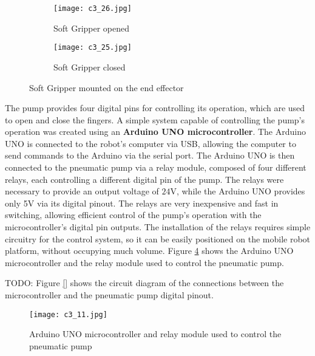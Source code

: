 \begin{figure}[t]
    \centering
    \begin{subfigure}{0.45\textwidth}
        \texttt{[image: c3\_26.jpg]}
        \caption{Soft Gripper opened}
        \label{fig:opened}
    \end{subfigure}
    \hfill %
    \begin{subfigure}{0.45\textwidth}
        \texttt{[image: c3\_25.jpg]}
        \caption{Soft Gripper closed}
        \label{fig:closed}
    \end{subfigure}
    \caption{Soft Gripper mounted on the end effector}
    \label{fig:sg_combined}
\end{figure}


The pump provides four digital pins for controlling its operation, which are used to open and close the fingers.
A simple system capable of controlling the pump's operation was created using an \textbf{Arduino UNO microcontroller}.
The Arduino UNO is connected to the robot's computer via USB, allowing the computer to send commands to the Arduino
via the serial port. The Arduino UNO is then connected to the pneumatic pump via a relay module,
composed of four different relays, each controlling a different digital pin of the pump. The relays were necessary
to provide an output voltage of $24$V, while the Arduino UNO provides only 5V via its digital pinout.
The relays are very inexpensive and fast in switching, allowing efficient
control of the pump's operation with the microcontroller's digital pin outputs.
The installation of the relays requires simple circuitry for the control system, so it can be easily positioned
on the mobile robot platform, without occupying much volume.
Figure \ref{fig:c3_img10} shows the Arduino UNO microcontroller and the relay module used to control the pneumatic pump.

TODO: Figure \ref{} shows the circuit diagram of the connections between the microcontroller 
and the pneumatic pump digital pinout.

\begin{figure}[t]
    \centering
    \texttt{[image: c3\_11.jpg]}
    \captionsetup{width=1\linewidth}
    \caption{Arduino UNO microcontroller and relay module used to control the pneumatic pump}
    \label{fig:c3_img10}
\end{figure}

